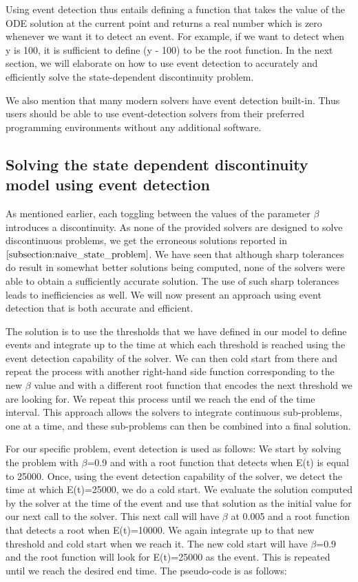 Using event detection thus entails defining a function that takes the value of the ODE solution at the current point and returns a real number which is zero whenever we want it to detect an event. For example, if we want to detect when y is 100, it is sufficient to define (y - 100) to be the root function. In the next section, we will elaborate on how to use event detection to accurately and efficiently solve the state-dependent discontinuity problem.

We also mention that many modern solvers have event detection built-in. Thus users should be able to use event-detection solvers from their preferred programming environments without any additional software.

\subsection{Solving the state dependent discontinuity model using event detection}
\label{subsection:state_with_event_detection}
As mentioned earlier, each toggling between the values of the parameter $\beta$ introduces a discontinuity. As none of the provided solvers are designed to solve discontinuous problems, we get the erroneous solutions reported in $\ref{subsection:naive_state_problem}$. We have seen that although sharp tolerances do result in somewhat better solutions being computed, none of the solvers were able to obtain a sufficiently accurate solution. The use of such sharp tolerances leads to inefficiencies as well. We will now present an approach using event detection that is both accurate and efficient.

The solution is to use the thresholds that we have defined in our model to define events and integrate up to the time at which each threshold is reached using the event detection capability of the solver. We can then cold start from there and repeat the process with another right-hand side function corresponding to the new $\beta$ value and with a different root function that encodes the next threshold we are looking for. We repeat this process until we reach the end of the time interval. This approach allows the solvers to integrate continuous sub-problems, one at a time, and these sub-problems can then be combined into a final solution.

For our specific problem, event detection is used as follows:
We start by solving the problem with $\beta$=0.9 and with a root function that detects when E(t) is equal to 25000. Once, using the event detection capability of the solver, we detect the time at which E(t)=25000, we do a cold start. We evaluate the solution computed by the solver at the time of the event and use that solution as the initial value for our next call to the solver. This next call will have $\beta$ at 0.005 and a root function that detects a root when E(t)=10000. We again integrate up to that new threshold and cold start when we reach it. The new cold start will have $\beta$=0.9 and the root function will look for E(t)=25000 as the event. This is repeated until we reach the desired end time. The pseudo-code is as follows:

